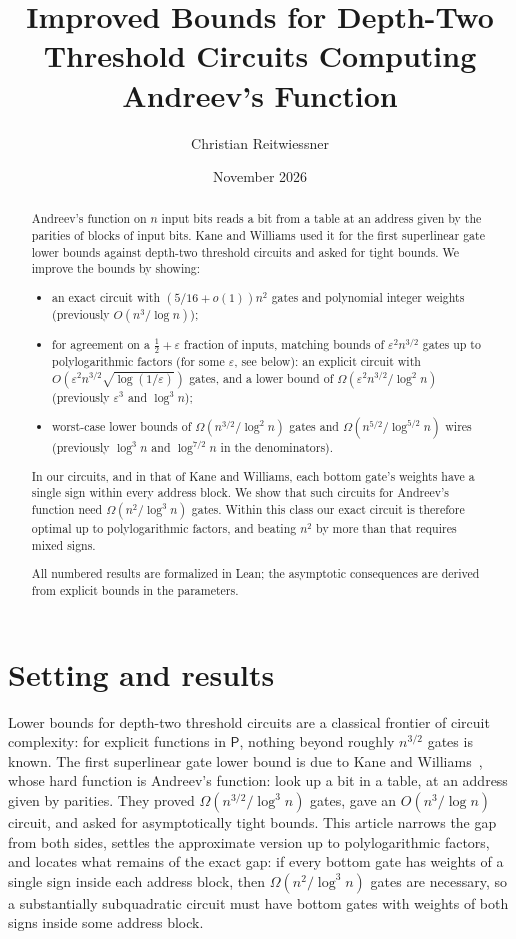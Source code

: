 \documentclass[11pt,letterpaper]{article}
\title{Improved Bounds for Depth-Two Threshold Circuits Computing Andreev's Function}
\author{Christian Reitwiessner}
\date{November 2026}
\theoremstyle{remark}
\begin{document}
\maketitle

\begin{abstract}
Andreev's function on $n$ input bits reads a bit from a
table at an address given by the parities of blocks of input bits. Kane and
Williams used it for the first superlinear gate lower bounds against
depth-two threshold circuits and asked for tight bounds. We improve the bounds by showing:
\begin{itemize}
\item an exact circuit with $(5/16+o(1))n^2$ gates and polynomial integer
      weights (previously $O(n^3/\log n)$);
\item for agreement on a $\tfrac12+\varepsilon$ fraction of inputs, matching
      bounds of $\varepsilon^2n^{3/2}$ gates up to polylogarithmic factors
      (for some $\varepsilon$, see below):
      an explicit circuit with $O(\varepsilon^2n^{3/2}\sqrt{\log(1/\varepsilon)})$
      gates, and a lower bound of $\Omega(\varepsilon^2n^{3/2}/\log^2n)$
      (previously $\varepsilon^3$ and $\log^3n$);
\item worst-case lower bounds of $\Omega(n^{3/2}/\log^2 n)$ gates and
      $\Omega(n^{5/2}/\log^{5/2}n)$ wires (previously $\log^3 n$ and
      $\log^{7/2}n$ in the denominators).
\end{itemize}
In our circuits, and in that of Kane and Williams, each bottom gate's weights
have a single sign within every address block. We show that such circuits
for Andreev's function need $\Omega(n^2/\log^3n)$ gates. Within this class our
exact circuit is therefore optimal up to polylogarithmic factors, and beating
$n^2$ by more than that requires mixed signs.

All numbered results are formalized in Lean; the asymptotic consequences
are derived from explicit bounds in the parameters.
\end{abstract}

\section{Setting and results}

Lower bounds for depth-two threshold circuits are a classical frontier of
circuit complexity: for explicit functions in $\mathsf P$, nothing beyond
roughly $n^{3/2}$ gates is known. The first superlinear gate lower bound is
due to Kane and Williams~\cite{KW}, whose hard function is Andreev's function: look up a bit
in a table, at an address given by parities. They proved
$\Omega(n^{3/2}/\log^3n)$ gates, gave an $O(n^3/\log n)$ circuit, and asked for
asymptotically tight bounds. This article narrows the gap from both sides,
settles the approximate version up to polylogarithmic factors, and locates
what remains of the exact gap: if every bottom gate has weights of a single
sign inside each address block, then $\Omega(n^2/\log^3n)$ gates are
necessary, so a substantially subquadratic circuit must have bottom gates
with weights of both signs inside some address block.
\end{document}
